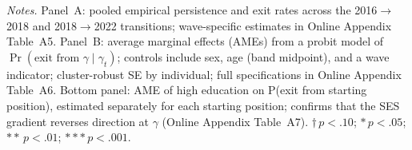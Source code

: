 \begin{table}[htbp]
\centering
\caption{Portfolio-position persistence and socioeconomic gradient in exits from bridging}
\label{table:h3_main}
\small
\renewcommand{\arraystretch}{1.10}
\begin{minipage}{\textwidth}
  \vspace{5pt}
  \footnotesize
  \textit{Notes.} Panel~A: pooled empirical persistence and exit rates across
  the 2016$\to$2018 and 2018$\to$2022 transitions; wave-specific estimates in
  Online Appendix Table~A5. Panel~B: average marginal effects (AMEs) from a
  probit model of $\Pr(\text{exit from } \gamma \mid \gamma_t)$; controls
  include sex, age (band midpoint), and a wave indicator; cluster-robust SE
  by individual; full specifications in Online Appendix Table~A6. Bottom
  panel: AME of high education on P(exit from starting position), estimated
  separately for each starting position; confirms that the SES gradient
  reverses direction at $\gamma$ (Online Appendix Table~A7).
  $\dagger\,p < .10$; $*\,p < .05$; $**\,p < .01$; $***\,p < .001$.
\end{minipage}
\end{table}

